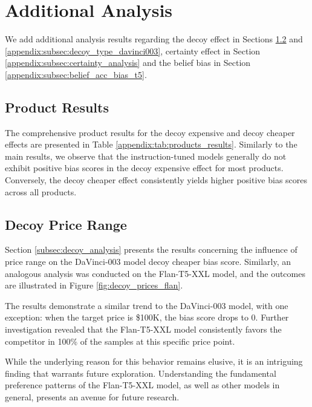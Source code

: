 

\section{Additional Analysis}
\label{appendix:sec:additional_analysis}

We add additional analysis results regarding the decoy effect in Sections \ref{appendix:subsec:price_range} and \ref{appendix:subsec:decoy_type_davinci003}, certainty effect in Section \ref{appendix:subsec:certainty_analysis} and the belief bias in Section \ref{appendix:subsec:belief_acc_bias_t5}.


\subsection{Product Results}
\label{appendix:subsec:products_results}
The comprehensive product results for the decoy expensive and decoy cheaper effects are presented in Table \ref{appendix:tab:products_results}.
Similarly to the main results, we observe that the instruction-tuned models generally do not exhibit positive bias scores in the decoy expensive effect for most products.
Conversely, the decoy cheaper effect consistently yields higher positive bias scores across all products.



\subsection{Decoy Price Range}
\label{appendix:subsec:price_range}

Section \ref{subsec:decoy_analysis} presents the results concerning the influence of price range on the DaVinci-003 model decoy cheaper bias score.
Similarly, an analogous analysis was conducted on the Flan-T5-XXL model, and the outcomes are illustrated in Figure \ref{fig:decoy_prices_flan}.

The results demonstrate a similar trend to the DaVinci-003 model, with one exception: when the target price is \$100K, the bias score drops to 0.
Further investigation revealed that the Flan-T5-XXL model consistently favors the competitor in 100\% of the samples at this specific price point.

While the underlying reason for this behavior remains elusive, it is an intriguing finding that warrants future exploration. Understanding the fundamental preference patterns of the Flan-T5-XXL model, as well as other models in general, presents an avenue for future research.


